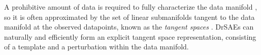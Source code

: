 \documentclass{article} %
\begin{document}
A prohibitive amount of data is required to fully characterize the data manifold \citep{narayanan2010}, so it is often approximated by the set of linear submanifolds tangent to the data manifold at the observed datapoints, known as the \emph{tangent spaces} \citep{simard1998, rifai2011b, ekanadham2011}.  %
DrSAEs can naturally and efficiently form an explicit tangent space representation, consisting of a template and a perturbation within the data manifold.  %



\end{document}
